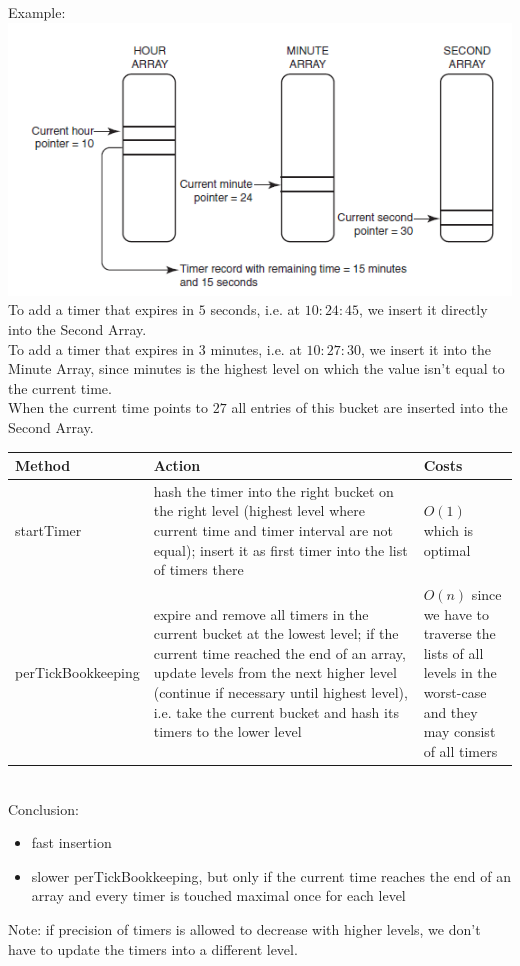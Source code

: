 Example:\\
\includegraphics[width=0.5\linewidth]{images/chap7/hierarchicalTimingWheel.png}\\
To add a timer that expires in $5$ seconds, i.e. at $10:24:45$, we insert it directly into the Second Array.\\
To add a timer that expires in $3$ minutes, i.e. at $10:27:30$, we insert it into the Minute Array, since minutes is the highest level on which the value isn't equal to the current time.\\
When the current time points to $27$ all entries of this bucket are inserted into the Second Array.\\

\begin{tabular}{p{0.2\linewidth}|p{0.6\linewidth}|p{0.2\linewidth}}
Method & Action & Costs \\
\hline \hline
startTimer & hash the timer into the right bucket on the right level (highest level where current time and timer interval are not equal); insert it as first timer into the list of timers there & $O(1)$ which is optimal\\
perTickBookkeeping & expire and remove all timers in the current bucket at the lowest level; if the current time reached the end of an array, update levels from the next higher level (continue if necessary until highest level), i.e. take the current bucket and hash its timers to the lower level &  $O(n)$ since we have to traverse the lists of all levels in the worst-case and they may consist of all timers \\
\end{tabular}\\

Conclusion: 
\begin{itemize}
\item fast insertion
\item slower perTickBookkeeping, but only if the current time reaches the end of an array and every timer is touched maximal once for each level
\end{itemize}

Note: if precision of timers is allowed to decrease with higher levels, we don't have to update the timers into a different level.

